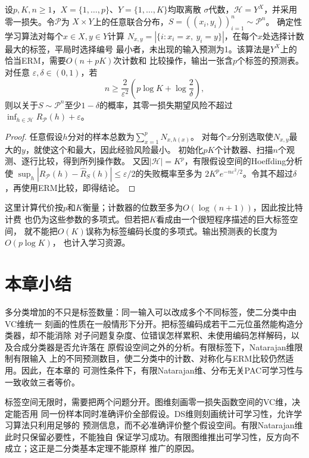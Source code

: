 \begin{theorem}[有限输入上的多分类表学习]
\label{thm:multiclass-table-erm}
设$p,K,n\geq1$，$X=\{1,\ldots,p\}$、$Y=\{1,\ldots,K\}$均取离散
$\sigma$代数，$\mathcal H=Y^X$，并采用零一损失。令$\mathcal P$为
$X\times Y$上的任意联合分布，$S=((x_i,y_i))_{i=1}^n\sim\mathcal P^n$。
确定性学习算法对每个$x\in X,y\in Y$计算
$N_{x,y}=|\{i:x_i=x,\ y_i=y\}|$，在每个$x$处选择计数最大的标签，平局时选择编号
最小者，未出现的输入预测为1。该算法是$Y^X$上的恰当ERM，需要$O(n+pK)$次计数和
比较操作，输出一张含$p$个标签的预测表。对任意
$\varepsilon,\delta\in(0,1)$，若
\[
 n\geq\frac{2}{\varepsilon^2}
       \left(p\log K+\log\frac2\delta\right),
\]
则以关于$S\sim\mathcal P^n$至少$1-\delta$的概率，其零一损失期望风险不超过
$\inf_{h\in\mathcal H}R_{\mathcal P}(h)+\varepsilon$。
\end{theorem}

\begin{proof}
任意假设$h$分对的样本总数为$\sum_{x=1}^pN_{x,h(x)}$。
对每个$x$分别选取使$N_{x,y}$最大的$y$，就使这个和最大，因此经验风险最小。
初始化$pK$个计数器、扫描$n$个观测、逐行比较，得到所列操作数。
又因$|\mathcal H|=K^p$，有限假设空间的Hoeffding分析使
$\sup_h|R_{\mathcal P}(h)-\hat R_S(h)|\leq\varepsilon/2$的失败概率至多为
$2K^p e^{-n\varepsilon^2/2}$。令其不超过$\delta$，再使用ERM比较，即得结论。
\end{proof}

这里计算代价按$p$和$K$衡量；计数器的位数至多为$O(\log(n+1))$，因此按比特计费
也仍为这些参数的多项式。但若把$K$看成由一个很短程序描述的巨大标签空间，
就不能把$O(K)$误称为标签编码长度的多项式。输出预测表的长度为$O(p\log K)$，
也计入学习资源。

\section{本章小结}
\label{sec:multiclass-learning-summary}

多分类增加的不只是标签数量：同一输入可以改成多个不同标签，使二分类中由VC维统一
刻画的性质在一般情形下分开。把标签编码成若干二元位虽然能构造分类器，却不能消除
对子问题复杂度、位错误怎样累积、未使用编码怎样解码，以及合成分类器是否允许落在
原假设空间之外的分析。有限标签下，Natarajan维限制有限输入
上的不同预测数目，使二分类中的计数、对称化与ERM比较仍然适用。因此，在本章的
可测性条件下，有限Natarajan维、分布无关PAC可学习性与一致收敛三者等价。

标签空间无限时，需要把两个问题分开。图维刻画零一损失函数空间的VC维，决定能否用
同一份样本同时准确评价全部假设。DS维则刻画统计可学习性，允许学习算法只利用足够的
预测信息，而不必准确评价整个假设空间。有限Natarajan维此时只保留必要性，不能独自
保证学习成功。有限图维推出可学习性，反方向不成立；这正是二分类基本定理不能原样
推广的原因。

